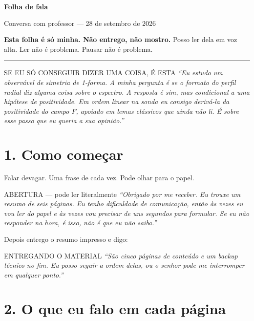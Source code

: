 \documentclass[12pt,a4paper]{article}
\newcommand{\fala}[1]{\textit{\color{ink}``#1''}}
\begin{document}
{\Large\bfseries\color{ink} Folha de fala}\par
{\large Conversa com professor --- 28 de setembro de 2026}\par
\vspace{1mm}
{\small\color{rust}\textbf{Esta folha é só minha. Não entrego, não mostro.}
Posso ler dela em voz alta. Ler não é problema. Pausar não é problema.}

\vspace{3mm}
\hrule
\vspace{3mm}

\begin{safe}{SE EU SÓ CONSEGUIR DIZER UMA COISA, É ESTA}
\fala{Eu estudo um observável de simetria de 1-forma. A minha pergunta é se
o \emph{formato} do perfil radial diz alguma coisa sobre o espectro. A resposta
é sim, mas \emph{condicional} a uma hipótese de positividade. Em ordem linear
na sonda eu consigo derivá-la da positividade do campo $F$, apoiado em lemas
clássicos que ainda não li. É sobre esse passo que eu queria a sua opinião.}
\end{safe}

\section*{1. Como começar}

Falar devagar. Uma frase de cada vez. Pode olhar para o papel.

\begin{say}{ABERTURA --- pode ler literalmente}
\fala{Obrigado por me receber. Eu trouxe um resumo de seis páginas.
Eu tenho dificuldade de comunicação, então às vezes eu vou ler do papel e
às vezes vou precisar de uns segundos para formular. Se eu não responder na
hora, é isso, não é que eu não saiba.}
\end{say}

Depois entrego o resumo impresso e digo:

\begin{say}{ENTREGANDO O MATERIAL}
\fala{São cinco páginas de conteúdo e um backup técnico no fim.
Eu posso seguir a ordem delas, ou o senhor pode me interromper em qualquer ponto.}
\end{say}

\section*{2. O que eu falo em cada página}
\end{document}
